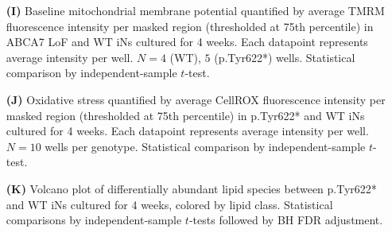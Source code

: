 \begin{itemize}
    \item[\textbf{(I)}] Baseline mitochondrial membrane potential quantified by average TMRM fluorescence intensity per masked region (thresholded at 75th percentile) in ABCA7 LoF and WT iNs cultured for 4 weeks. Each datapoint represents average intensity per well. $N=4$ (WT), $5$ (p.Tyr622*) wells. Statistical comparison by independent-sample $t$-test.
    \item[\textbf{(J)}] Oxidative stress quantified by average CellROX fluorescence intensity per masked region (thresholded at 75th percentile) in p.Tyr622* and WT iNs cultured for 4 weeks. Each datapoint represents average intensity per well. $N=10$ wells per genotype. Statistical comparison by independent-sample $t$-test.
    \item[\textbf{(K)}] Volcano plot of differentially abundant lipid species between p.Tyr622* and WT iNs cultured for 4 weeks, colored by lipid class. Statistical comparisons by independent-sample $t$-tests followed by BH FDR adjustment.
\end{itemize}
